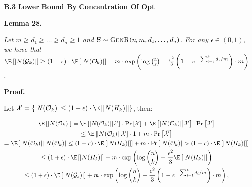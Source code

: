 \documentclass[10pt,a4paper]{article}
\begin{document}
\par\medskip\noindent\textbf{B.3 Lower Bound By Concentration Of Opt}\par





\par\medskip\noindent\textbf{\textbf{Lemma 28}\textbf{.}}\par



\emph{Let $m\geq d_{1}\geq\dots\geq d_{n}\geq 1$ and $\mathcal{B}\sim\textsc{GenR}(n,m,d_{1},\dots,d_{n})$.
For any $\epsilon\in(0,1)$, we have that
$\E\left[|N(\mathcal{G}_{k})|\right]\geq(1-\epsilon)\cdot\E\left[|N(\mathcal{O}_{k})|\right]-m\cdot\exp\left(\log\binom{n}{k}-\frac{\epsilon^{2}}{3}\left(1-e^{-\sum_{i=1}^{k}d_{i}/m}\right)\cdot m\right)$.}\par






\par\medskip\noindent\textbf{Proof.}\par



Let $\mathcal{X}=\{|N(\mathcal{O}_{k})|\leq(1+\epsilon)\cdot\E\left[|N(H_{k})|\right]\}$, then:\par


\[\begin{gathered}
\displaystyle\E\left[|N(\mathcal{O}_{k})|\right] \displaystyle=\E\left[|N(\mathcal{O}_{k})|\middle|\mathcal{X}\right]\cdot\Pr\left[\mathcal{X}\right]+\E\left[|N(\mathcal{O}_{k})|\middle|\bar{\mathcal{X}}\right]\cdot\Pr\left[\bar{\mathcal{X}}\right] \\
\displaystyle\leq\E\left[|N(\mathcal{O}_{k})|\middle|\mathcal{X}\right]\cdot 1+m\cdot\Pr\left[\bar{\mathcal{X}}\right] \\
\displaystyle=\E\left[|N(\mathcal{O}_{k})|\middle||N(\mathcal{O}_{k})|\leq(1+\epsilon)\cdot\E\left[|N(H_{k})|\right]\right]+m\cdot\Pr\left[|N(\mathcal{O}_{k})|>(1+\epsilon)\cdot\E\left[|N(H_{k})|\right]\right] \\
\displaystyle\leq(1+\epsilon)\cdot\E\left[|N(H_{k})|\right]+m\cdot\exp\left(\log{\binom{n}{k}}-\frac{\epsilon^{2}}{3}\E\left[|N(H_{k})|\right]\right) \\
\displaystyle\leq(1+\epsilon)\cdot\E\left[|N(\mathcal{G}_{k})|\right]+m\cdot\exp\left(\log{\binom{n}{k}}-\frac{\epsilon^{2}}{3}\left(1-e^{-\sum_{i=1}^{k}d_{i}/m}\right)\cdot m\right),
\end{gathered}\]
\end{document}
